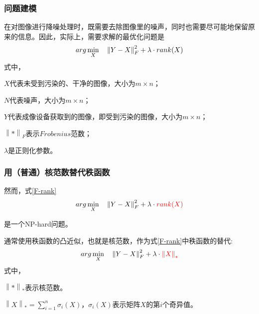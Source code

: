 \documentclass[10pt,aspectratio=43,mathserif]{beamer}
\begin{document}
\begin{frame}
\frametitle{\textbf{问题建模}}
\par 在对图像进行降噪处理时，既需要去除图像里的噪声，同时也需要尽可能地保留原来的信息。因此，实际上，需要求解的最优化问题是
\begin{equation}
\centering
arg\min\limits_{X} \quad \left\|Y-X\right\|_F^2 + \lambda \cdot rank(X)
\label{F-rank}
\end{equation}
式中，
\par$X$代表未受到污染的、干净的图像，大小为$m \times n$；
\par$N$代表噪声，大小为$m \times n$；
\par$Y$代表成像设备获取到的图像，即受到污染的图像，大小为$m \times n$；
\par$\left\|*\right\|_F$表示$Frobenius$范数；
\par$\lambda$是正则化参数。

\end{frame}

\begin{frame}
\frametitle{\textbf{用（普通）核范数替代秩函数}}
\par 然而，式\ref{F-rank}
\begin{displaymath}
arg\min\limits_{X} \quad \left\|Y-X\right\|_F^2 + \lambda \cdot {\color{red}{rank(X)}}
\end{displaymath}
\par 是一个NP-hard问题。
\newline
\newline
\par 通常使用秩函数的凸近似，也就是核范数，作为式\ref{F-rank}中秩函数的替代:
\begin{equation}
\centering
arg\min\limits_{X} \quad \left\|Y-X\right\|_F^2 + \lambda \cdot {\color{red}{\left\|X\right\|_*}}
\label{F-NN}
\end{equation}
式中，
\par $\left\|*\right\|_*$表示核范数。
\par $\left\|X\right\|_* = \sum\limits_{i=1}^{n}\sigma_i(X)$，$\sigma_i(X)$表示矩阵$X$的第$i$个奇异值。
\end{frame}
\end{document}
